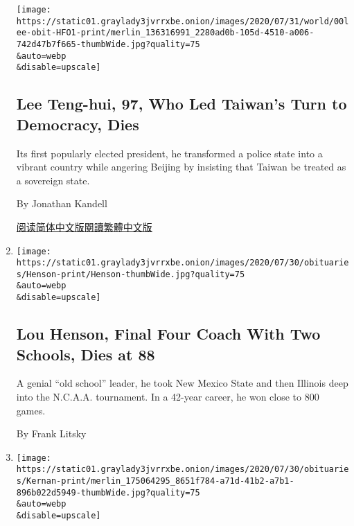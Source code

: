 \begin{enumerate}
  \texttt{[image: https://static01.graylady3jvrrxbe.onion/images/2020/07/31/world/00lee-obit-HFO1-print/merlin\_136316991\_2280ad0b-105d-4510-a006-742d47b7f665-thumbWide.jpg?quality=75\\\&auto=webp\\\&disable=upscale]}

  \hypertarget{lee-teng-hui-97-who-led-taiwans-turn-to-democracy-dies}{%
  \subsection{Lee Teng-hui, 97, Who Led Taiwan's Turn to Democracy,
  Dies}\label{lee-teng-hui-97-who-led-taiwans-turn-to-democracy-dies}}

  Its first popularly elected president, he transformed a police state
  into a vibrant country while angering Beijing by insisting that Taiwan
  be treated as a sovereign state.

  By Jonathan Kandell

  \href{https://cn.nytimes3xbfgragh.onion/asia-pacific/20200730/lee-teng-hui-dead/}{阅读简体中文版}\href{https://cn.nytimes3xbfgragh.onion/asia-pacific/20200730/lee-teng-hui-dead/zh-hant/}{閱讀繁體中文版}
\item
  \href{/2020/07/29/sports/ncaabasketball/lou-henson-dead.html}{}

  \texttt{[image: https://static01.graylady3jvrrxbe.onion/images/2020/07/30/obituaries/Henson-print/Henson-thumbWide.jpg?quality=75\\\&auto=webp\\\&disable=upscale]}

  \hypertarget{lou-henson-final-four-coach-with-two-schools-dies-at-88}{%
  \subsection{Lou Henson, Final Four Coach With Two Schools, Dies at
  88}\label{lou-henson-final-four-coach-with-two-schools-dies-at-88}}

  A genial ``old school'' leader, he took New Mexico State and then
  Illinois deep into the N.C.A.A. tournament. In a 42-year career, he
  won close to 800 games.

  By Frank Litsky
\item
  \href{/2020/07/29/us/politics/joseph-kernan-dead.html}{}

  \texttt{[image: https://static01.graylady3jvrrxbe.onion/images/2020/07/30/obituaries/Kernan-print/merlin\_175064295\_8651f784-a71d-41b2-a7b1-896b022d5949-thumbWide.jpg?quality=75\\\&auto=webp\\\&disable=upscale]}

  \hypertarget{joseph-kernan-vietnam-pow-and-indiana-governor-dies-at-74}{%
}
\end{enumerate}
